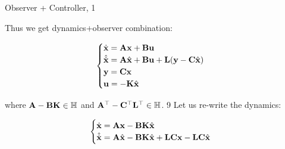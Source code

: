 \documentclass{beamer}
\begin{document}
\begin{frame}{Observer + Controller, 1}
\begin{flushleft}

Thus we get dynamics+observer combination:

\begin{equation}
\begin{cases}
\dot {\mathbf{x}} = \mathbf{A} \mathbf{x} + \mathbf{B} \mathbf{u} \\
\hat{\dot {\mathbf{x}}} = \mathbf{A} \hat{\mathbf{x}} + \mathbf{B} \mathbf u + \mathbf{L}(\mathbf y - \mathbf{C} \hat{\mathbf{x}})\\
\mathbf{y} = \mathbf{C} \mathbf{x} \\
\mathbf{u} = -\mathbf{K} \hat{\mathbf{x}}
\end{cases}
\end{equation}

\bigskip

where $\mathbf{A} - \mathbf{B} \mathbf{K} \in \mathbb{H}$ and $\mathbf{A}^{\top} - 
\mathbf{C}^{\top} \mathbf{L}^{\top} \in \mathbb{H}$.
9
Let us re-write the dynamics:

\begin{equation}
	\begin{cases}
		\dot {\mathbf{x}} =\mathbf{A} \mathbf{x} - \mathbf{B} \mathbf{K} \hat{\mathbf{x}} 
		\\
		\hat{\dot {\mathbf{x}}} = \mathbf{A} \hat{\mathbf{x}} - \mathbf{B} \mathbf{K}\hat{\mathbf{x}} +\mathbf{L}\mathbf{C} \mathbf{x} - \mathbf{L}\mathbf{C} \hat{\mathbf{x}}
	\end{cases}
\end{equation}


\end{flushleft}
\end{frame}
\end{document}
